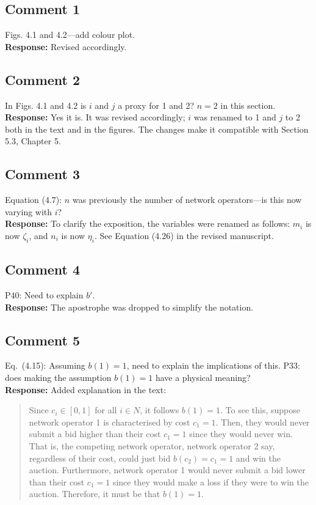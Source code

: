 \documentclass[10pt,a4paper,notitlepage]{article}
\numberwithin{equation}{section}
\begin{document}
\subsection{Comment 1}
Figs. 4.1 and 4.2---add colour plot.\\[-2ex]

\textbf{Response:}
Revised accordingly.

\subsection{Comment 2}
In Figs. 4.1 and 4.2 is $i$ and $j$ a proxy for 1 and 2? $n=2$ in this section.\\[-2ex]

\textbf{Response:}
Yes it is. It was revised accordingly; $i$ was renamed to 1 and $j$ to 2 both in the text and in the figures. The changes make it compatible with Section 5.3, Chapter 5.

\subsection{Comment 3}
Equation (4.7): $n$ was previously the number of network operators---is this now varying with $i$?\\[-2ex]

\textbf{Response:}
To clarify the exposition, the variables were renamed as follows: $m_i$ is now $\zeta_i$, and $n_i$ is now $\eta_i$. See Equation (4.26) in the revised manuscript.

\subsection{Comment 4}
P40: Need to explain $b'$.\\[-2ex]

\textbf{Response:}
The apostrophe was dropped to simplify the notation.

\subsection{Comment 5}
Eq.~(4.15): Assuming $b(1) = 1$, need to explain the implications of this. P33: does making the assumption $b(1)=1$ have a physical meaning?\\[-2ex]

\textbf{Response:}
Added explanation in the text:
\begin{quote}
Since $c_i\in [0,1]$ for all $i\in N$, it follows $b(1) = 1$. To see this, suppose network operator 1 is characterised by cost $c_1 = 1$. Then, they would never submit a bid higher than their cost $c_1 = 1$ since they would never win. That is, the competing network operator, network operator 2 say, regardless of their cost, could just bid $b(c_2) = c_1 = 1$ and win the auction. Furthermore, network operator 1 would never submit a bid lower than their cost $c_1 = 1$ since they would make a loss if they were to win the auction. Therefore, it must be that $b(1) = 1$.
\end{quote}
\end{document}
